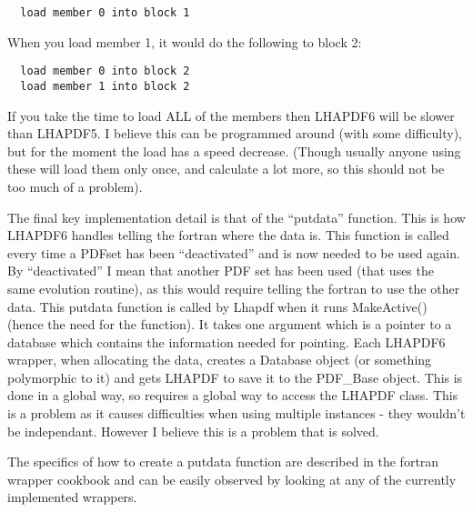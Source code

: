 \begin{verbatim}
  load member 0 into block 1
\end{verbatim}

When you load member 1, it would do the following to block 2:

\begin{verbatim}
  load member 0 into block 2
  load member 1 into block 2
\end{verbatim}

If you take the time to load ALL of the members then LHAPDF6 will be slower
than LHAPDF5. I believe this can be programmed around (with some 
difficulty), but for the moment the load has a speed decrease. (Though
usually anyone using these will load them only once, and calculate a lot
more, so this should not be too much of a problem).

The final key implementation detail is that of the ``putdata'' function.
This is how LHAPDF6 handles telling the fortran where the data is. This
function is called every time a PDFset has been ``deactivated'' and is now
needed to be used again. By ``deactivated'' I mean that another PDF set has
been used (that uses the same evolution routine), as this would require
telling the fortran to use the other data. This putdata function is called
by Lhapdf when it runs MakeActive() (hence the need for the function).
It takes one argument which is a pointer to a database which contains the
information needed for pointing. Each LHAPDF6 wrapper, when allocating the
data, creates a Database object (or something polymorphic to it) and gets
LHAPDF to save it to the PDF\_Base object. This is done in a global way,
so requires a global way to access the LHAPDF class. This is a problem as
it causes difficulties when using multiple instances - they wouldn't be
independant. However I believe this is a problem that is solved.

The specifics of how to create a putdata function are described in the
fortran wrapper cookbook and can be easily observed by looking at any of the
currently implemented wrappers.

